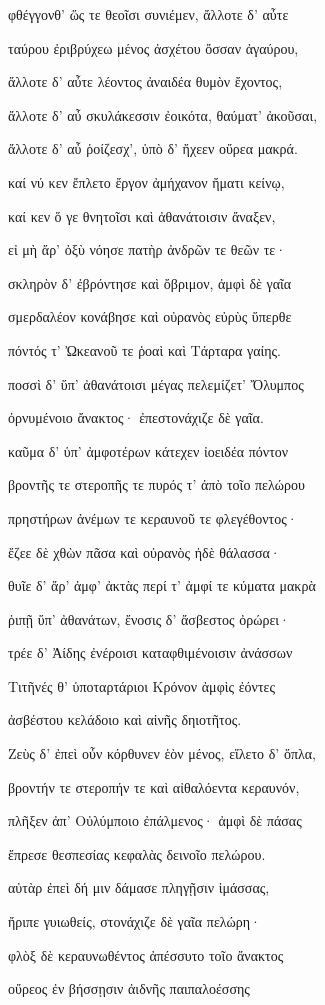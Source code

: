 \begin{pages}
\begin{Leftside}
φθέγγονθ' ὥς τε θεοῖσι συνιέμεν, ἄλλοτε δ' αὖτε

ταύρου ἐριβρύχεω μένος ἀσχέτου ὄσσαν ἀγαύρου, 

ἄλλοτε δ' αὖτε λέοντος ἀναιδέα θυμὸν ἔχοντος,

ἄλλοτε δ' αὖ σκυλάκεσσιν ἐοικότα, θαύματ' ἀκοῦσαι,

ἄλλοτε δ' αὖ ῥοίζεσχ', ὑπὸ δ' ἤχεεν οὔρεα μακρά. 

καί νύ κεν ἔπλετο ἔργον ἀμήχανον ἤματι κείνῳ,

καί κεν ὅ γε θνητοῖσι καὶ ἀθανάτοισιν ἄναξεν,

εἰ μὴ ἄρ' ὀξὺ νόησε πατὴρ ἀνδρῶν τε θεῶν τε· 

σκληρὸν δ' ἐβρόντησε καὶ ὄβριμον, ἀμφὶ δὲ γαῖα

σμερδαλέον κονάβησε καὶ οὐρανὸς εὐρὺς ὕπερθε 

πόντός τ' Ὠκεανοῦ τε ῥοαὶ καὶ Τάρταρα γαίης. 

ποσσὶ δ' ὕπ' ἀθανάτοισι μέγας πελεμίζετ' Ὄλυμπος

ὀρνυμένοιο ἄνακτος· ἐπεστονάχιζε δὲ γαῖα.

καῦμα δ' ὑπ' ἀμφοτέρων κάτεχεν ἰοειδέα πόντον

βροντῆς τε στεροπῆς τε πυρός τ' ἀπὸ τοῖο πελώρου  

πρηστήρων ἀνέμων τε κεραυνοῦ τε φλεγέθοντος· 

ἔζεε δὲ χθὼν πᾶσα καὶ οὐρανὸς ἠδὲ θάλασσα· 

θυῖε δ' ἄρ' ἀμφ' ἀκτὰς περί τ' ἀμφί τε κύματα μακρὰ

ῥιπῇ ὕπ' ἀθανάτων, ἔνοσις δ' ἄσβεστος ὀρώρει· 

τρέε δ' Ἀίδης ἐνέροισι καταφθιμένοισιν ἀνάσσων 

Τιτῆνές θ' ὑποταρτάριοι Κρόνον ἀμφὶς ἐόντες 

ἀσβέστου κελάδοιο καὶ αἰνῆς δηιοτῆτος. 

Ζεὺς δ' ἐπεὶ οὖν κόρθυνεν ἑὸν μένος, εἵλετο δ' ὅπλα,

βροντήν τε στεροπήν τε καὶ αἰθαλόεντα κεραυνόν,

πλῆξεν ἀπ' Οὐλύμποιο ἐπάλμενος· ἀμφὶ δὲ πάσας 

ἔπρεσε θεσπεσίας κεφαλὰς δεινοῖο πελώρου.

αὐτὰρ ἐπεὶ δή μιν δάμασε πληγῇσιν ἱμάσσας,

ἤριπε γυιωθείς, στονάχιζε δὲ γαῖα πελώρη· 

φλὸξ δὲ κεραυνωθέντος ἀπέσσυτο τοῖο ἄνακτος

οὔρεος ἐν βήσσῃσιν ἀιδνῆς παιπαλοέσσης 


\end{Leftside}
\end{pages}
